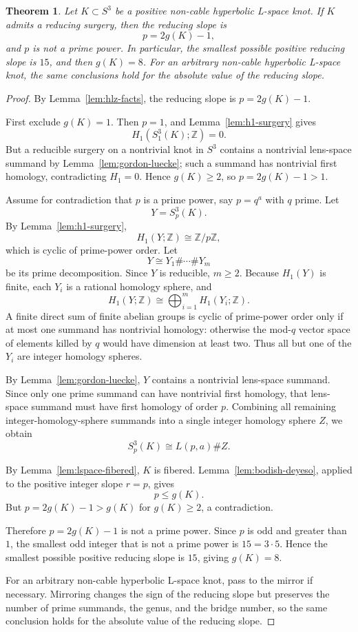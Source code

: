 \documentclass[12pt]{article}
\newtheorem{theorem}{Theorem}[section]
\theoremstyle{definition}
\newcommand{\Z}{\mathbb Z}
\begin{document}
\begin{theorem}\label{thm:no-prime-power}
Let \(K\subset S^3\) be a positive non-cable hyperbolic L-space knot.  If \(K\) admits a reducing surgery, then the reducing slope is
\[
p=2g(K)-1,
\]
and \(p\) is not a prime power.  In particular, the smallest possible positive reducing slope is \(15\), and then \(g(K)=8\).  For an arbitrary non-cable hyperbolic L-space knot, the same conclusions hold for the absolute value of the reducing slope.
\end{theorem}

\begin{proof}
By Lemma~\ref{lem:hlz-facts}, the reducing slope is \(p=2g(K)-1\).

First exclude \(g(K)=1\).  Then \(p=1\), and Lemma~\ref{lem:h1-surgery} gives
\[
H_1(S^3_1(K);\Z)=0.
\]
But a reducible surgery on a nontrivial knot in \(S^3\) contains a nontrivial lens-space summand by Lemma~\ref{lem:gordon-luecke}; such a summand has nontrivial first homology, contradicting \(H_1=0\).  Hence \(g(K)\ge 2\), so \(p=2g(K)-1>1\).

Assume for contradiction that \(p\) is a prime power, say \(p=q^a\) with \(q\) prime.  Let
\[
Y=S^3_p(K).
\]
By Lemma~\ref{lem:h1-surgery},
\[
H_1(Y;\Z)\cong \Z/p\Z,
\]
which is cyclic of prime-power order.  Let
\[
Y\cong Y_1\#\cdots\#Y_m
\]
be its prime decomposition.  Since \(Y\) is reducible, \(m\ge 2\).  Because \(H_1(Y)\) is finite, each \(Y_i\) is a rational homology sphere, and
\[
H_1(Y;\Z)\cong \bigoplus_{i=1}^m H_1(Y_i;\Z).
\]
A finite direct sum of finite abelian groups is cyclic of prime-power order only if at most one summand has nontrivial homology: otherwise the mod-\(q\) vector space of elements killed by \(q\) would have dimension at least two.  Thus all but one of the \(Y_i\) are integer homology spheres.

By Lemma~\ref{lem:gordon-luecke}, \(Y\) contains a nontrivial lens-space summand.  Since only one prime summand can have nontrivial first homology, that lens-space summand must have first homology of order \(p\).  Combining all remaining integer-homology-sphere summands into a single integer homology sphere \(Z\), we obtain
\[
S^3_p(K)\cong L(p,a)\# Z.
\]

By Lemma~\ref{lem:lspace-fibered}, \(K\) is fibered.  Lemma~\ref{lem:bodish-deyeso}, applied to the positive integer slope \(r=p\), gives
\[
p\le g(K).
\]
But \(p=2g(K)-1>g(K)\) for \(g(K)\ge 2\), a contradiction.

Therefore \(p=2g(K)-1\) is not a prime power.  Since \(p\) is odd and greater than \(1\), the smallest odd integer that is not a prime power is \(15=3\cdot 5\).  Hence the smallest possible positive reducing slope is \(15\), giving \(g(K)=8\).

For an arbitrary non-cable hyperbolic L-space knot, pass to the mirror if necessary.  Mirroring changes the sign of the reducing slope but preserves the number of prime summands, the genus, and the bridge number, so the same conclusion holds for the absolute value of the reducing slope.
\end{proof}
\end{document}
